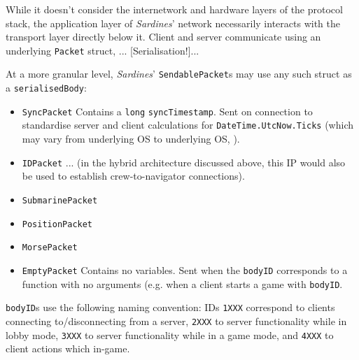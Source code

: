\documentclass[a4paper, 10pt]{article}
\begin{document}
\begin{flushleft}
While it doesn't consider the internetwork and hardware layers of the protocol stack, the application layer of \textit{Sardines}' network necessarily interacts with the transport layer directly below it. Client and server communicate using an underlying \texttt{Packet} struct, ...
[Serialisation!]...

\vspace{5pt}\noindent
At a more granular level, \textit{Sardines}' \texttt{SendablePacket}s may use any such struct as a \texttt{serialisedBody}:
\begin{itemize}[noitemsep]
\item \texttt{SyncPacket} Contains a \texttt{long} \texttt{syncTimestamp}. Sent on connection to standardise server and client calculations for \texttt{DateTime.UtcNow.Ticks} (which may vary from underlying OS to underlying OS, \citealp{msftUTC}).
\item \texttt{IDPacket} ... (in the hybrid architecture discussed above, this IP would also be used to establish crew-to-navigator connections).
\item \texttt{SubmarinePacket} 
\item \texttt{PositionPacket}
\item \texttt{MorsePacket}
\item \texttt{EmptyPacket} Contains no variables. Sent when the \texttt{bodyID} corresponds to a function with no arguments (e.g. when a client starts a game with \texttt{bodyID}.
\end{itemize}
\texttt{bodyID}s use the following naming convention: IDs \texttt{1XXX} correspond to clients connecting to/disconnecting from a server, \texttt{2XXX} to server functionality while in lobby mode, \texttt{3XXX} to server functionality while in a game mode, and \texttt{4XXX} to client actions which in-game.


\end{flushleft}
\end{document}
